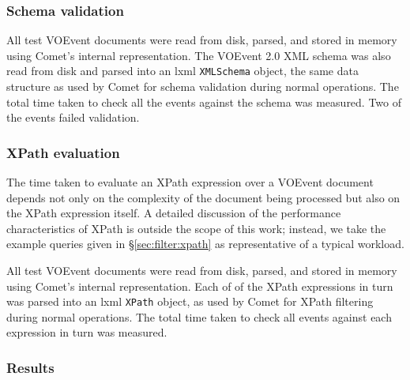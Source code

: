 \documentclass[5p,authoryear]{elsarticle}
\begin{document}
\subsubsection{Schema validation}

All test VOEvent documents were read from disk, parsed, and stored in memory
using Comet's internal representation. The VOEvent 2.0 XML schema was also
read from disk and parsed into an lxml \texttt{XMLSchema} object, the same
data structure as used by Comet for schema validation during normal
operations. The total time taken to check all the events against the schema
was measured. Two of the events failed validation.

\subsubsection{XPath evaluation}
\label{sec:perf:individual:xpath}

The time taken to evaluate an XPath expression over a VOEvent document depends
not only on the complexity of the document being processed but also on the
XPath expression itself. A detailed discussion of the performance
characteristics of XPath is outside the scope of this work; instead, we take
the example queries given in \S\ref{sec:filter:xpath} as representative of a
typical workload.

All test VOEvent documents were read from disk, parsed, and stored in memory
using Comet's internal representation. Each of of the XPath expressions in
turn was parsed into an lxml \texttt{XPath} object, as used by Comet for XPath
filtering during normal operations. The total time taken to check all events
against each expression in turn was measured.

\subsubsection{Results}
\label{sec:perf:individual:results}
\end{document}
